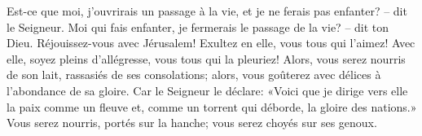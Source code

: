 Est-ce que moi, j’ouvrirais un passage à la vie,
	et je ne ferais pas enfanter? – dit le Seigneur.
Moi qui fais enfanter, je fermerais le passage de la vie? – dit ton Dieu.
Réjouissez-vous avec Jérusalem!
	Exultez en elle, vous tous qui l’aimez!
	Avec elle, soyez pleins d’allégresse, vous tous qui la pleuriez!
Alors, vous serez nourris de son lait, rassasiés de ses consolations;
	alors, vous goûterez avec délices à l’abondance de sa gloire.
Car le Seigneur le déclare:
	«Voici que je dirige vers elle la paix comme un fleuve
	et, comme un torrent qui déborde, la gloire des nations.»
Vous serez nourris, portés sur la hanche;
	vous serez choyés sur ses genoux.
